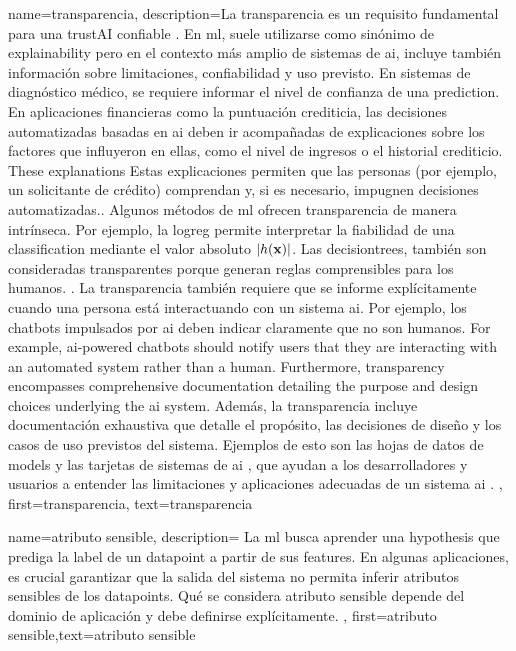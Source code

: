{name={transparencia},
	description={La transparencia es un requisito fundamental para una 
		\gls{trustAI} confiable \cite{HLEGTrustworhtyAI}. En \gls{ml},
		suele utilizarse como sinónimo de \gls{explainability} \cite{gallese2023ai,JunXML2020}
		pero en el contexto más amplio de sistemas de \gls{ai}, 
		incluye también información sobre limitaciones, confiabilidad y uso previsto. 
		En sistemas de diagnóstico médico, se requiere informar el nivel de confianza de una \gls{prediction}.
		En aplicaciones financieras como la puntuación crediticia, las decisiones automatizadas basadas en \gls{ai}
		deben ir acompañadas de explicaciones sobre los factores que influyeron en ellas, como el nivel de ingresos o el historial crediticio. These explanations 
		Estas explicaciones permiten que las personas (por ejemplo, un solicitante de crédito) comprendan y, 
		si es necesario, impugnen decisiones automatizadas.. 
		Algunos métodos de \gls{ml} ofrecen transparencia de manera intrínseca. Por ejemplo, la \gls{logreg} 
		permite interpretar la fiabilidad de una \gls{classification} mediante el valor absoluto $|h({\bf x})|$. 
		Las \gls{decisiontree}s,  también son consideradas transparentes porque generan reglas comprensibles para los humanos.
		\cite{rudin2019stop}.
		La transparencia también requiere que se informe explícitamente cuando una persona está interactuando con un sistema \gls{ai}.
		Por ejemplo, los chatbots impulsados por \gls{ai} deben indicar claramente que no son humanos. 
		For example, \gls{ai}-powered chatbots should notify users that they are interacting with an 
		automated system rather than a human. Furthermore, transparency encompasses comprehensive 
		documentation detailing the purpose and design choices underlying the \gls{ai} system. 
		Además, la transparencia incluye documentación exhaustiva que detalle el propósito, las decisiones de diseño y los casos de uso previstos del sistema.
		Ejemplos de esto son las hojas de datos de \gls{model}s \cite{DatasheetData2021}
		 y las tarjetas de sistemas de \gls{ai} \cite{10.1145/3287560.3287596}, 
		 que ayudan a los desarrolladores y usuarios a entender las limitaciones y aplicaciones adecuadas de un sistema \gls{ai} \cite{Shahriari2017}.
		 },
	first={transparencia}, text={transparencia} 
}


{
	name=atributo sensible,
	description={
		La \gls{ml} busca aprender una \gls{hypothesis} que prediga la \gls{label} de un \gls{datapoint} a partir de sus \gls{feature}s.
		En algunas aplicaciones, es crucial garantizar que la salida del sistema no permita inferir atributos sensibles de los \gls{datapoint}s.
		Qué se considera atributo sensible depende del dominio de aplicación y debe definirse explícitamente.
	},
	first={atributo sensible},text={atributo sensible}
}

